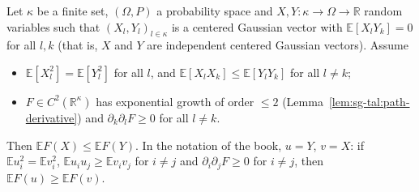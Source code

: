 \begin{theorem}\label{thm:sg-tal:slepian}
  \leanok
Let $\kappa$ be a finite set, $(\Omega,P)$ a probability space and $X,Y:\kappa\to\Omega\to\mathbb R$ random variables such that $(X_l,Y_l)_{l\in\kappa}$ is a centered Gaussian vector with
$\mathbb{E}[X_lY_k]=0$ for all $l,k$ (that is, $X$ and $Y$ are independent centered Gaussian vectors). Assume
\begin{itemize}
\item $\mathbb{E}[X_l^2]=\mathbb{E}[Y_l^2]$ for all $l$, and $\mathbb{E}[X_lX_k]\le\mathbb{E}[Y_lY_k]$ for all $l\ne k$;
\item $F\in C^2(\mathbb R^\kappa)$ has exponential growth of order $\le2$ (Lemma~\ref{lem:sg-tal:path-derivative}) and $\partial_k\partial_lF\ge0$ for all $l\ne k$.
\end{itemize}
Then $\mathbb{E}F(X)\le\mathbb{E}F(Y)$. In the notation of the book, $u=Y$, $v=X$: if $\mathbb{E}u_i^2=\mathbb{E}v_i^2$, $\mathbb{E}u_iu_j\ge\mathbb{E}v_iv_j$ for $i\ne j$ and $\partial_i\partial_jF\ge0$ for $i\ne j$, then $\mathbb{E}F(u)\ge\mathbb{E}F(v)$.
\end{theorem}
